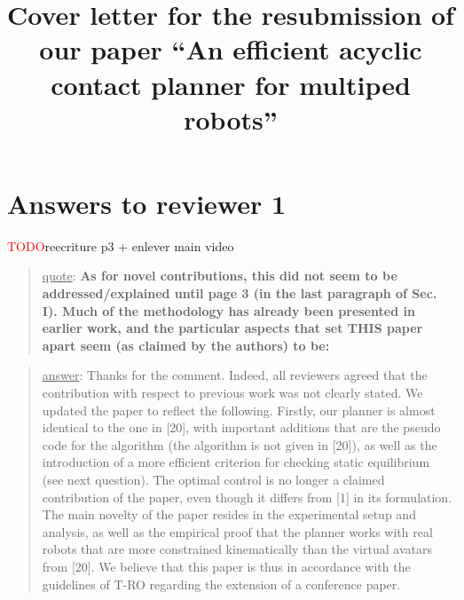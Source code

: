 \documentclass[a4paper]{article}
\author {}
\title {Cover letter for the resubmission of our paper ``An efficient acyclic contact planner for multiped robots''}
\date {}
\newcommand{\ndone}[0]{\textcolor{red}{TODO}}
\newcommand\quot[1]{\begin{quote} \underline{quote}: \textbf{#1}\end{quote}}
\newcommand\as[1]{\begin{quote} \underline{answer}: {#1}\end{quote} }
\begin{document}
\maketitle


\section{Answers to reviewer 1}
\ndone reecriture p3 + enlever main video

\quot {As for novel contributions, this did not seem to be addressed/explained
until page 3 (in the last paragraph of Sec. I). Much of the methodology
has already been presented in earlier work, and the particular aspects
that set THIS paper apart seem (as claimed by the authors) to be: 
}

\as{Thanks for the comment. Indeed, all reviewers agreed that the contribution with respect to previous work was not clearly stated. We updated the paper to reflect the following. Firstly, our planner is almost identical to the one in [20], with important additions that are the pseudo code for the algorithm (the algorithm is not given in [20]), as well as the introduction of a more efficient criterion
for checking static equilibrium (see next question). The optimal control is no longer a claimed contribution of the paper, even though it differs from [1] in its formulation. The main
novelty of the paper resides in the experimental setup and analysis, as well as the empirical proof that the planner works with real robots that are more constrained kinematically than the virtual avatars from [20]. We believe that this paper is thus in accordance with the guidelines of T-RO regarding the extension of a conference paper.}
\end{document}
